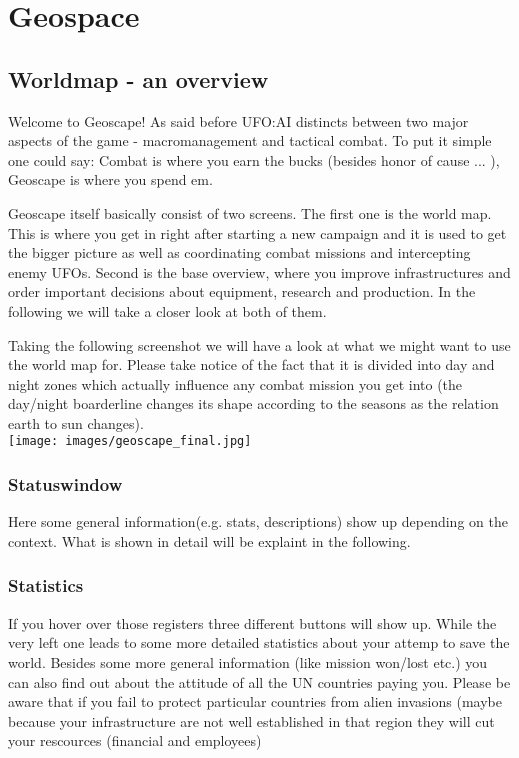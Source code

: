 \section{Geospace}

\subsection{Worldmap - an overview} 
Welcome to Geoscape! As said before UFO:AI distincts between two major aspects of the game - macromanagement and tactical combat. To put it simple one could say: Combat is where you earn the bucks (besides honor of cause ... ), Geoscape is where you spend em.

Geoscape itself basically consist of two screens. The first one is the world map. This is where you get in right after starting a new campaign and it is used to get the bigger picture as well as coordinating combat missions and intercepting enemy UFOs. Second is the base overview, where you improve infrastructures and order important decisions about equipment, research and production. In the following we will take a closer look at both of them.

Taking the following screenshot we will have a look at what we might want to use the world map for.
Please take notice of the fact that it is divided into day and night zones which actually influence any combat mission you get into (the day/night boarderline changes its shape according to the seasons as the relation earth to sun changes).\\

\texttt{[image: images/geoscape\_final.jpg]}

\newpage

\subsubsection{Statuswindow}
Here some general information(e.g. stats, descriptions) show up depending on the context. What is shown in detail will be explaint in the following.
\subsubsection{Statistics}
If you hover over those registers three different buttons will show up. While the very left one leads to some more detailed statistics about your attemp to save the world. Besides some more general information (like mission won/lost etc.) you can also find out about the attitude of all the UN countries paying you. Please be aware that if you fail to protect particular countries from alien invasions (maybe because your infrastructure are not well established in that region they will cut your rescources (financial and employees)
